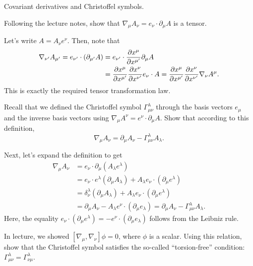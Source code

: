 \documentclass{../../templates/lkx_pset}
\begin{document}
\begin{problem}{2}
Covariant derivatives and Christoffel symbols.
\end{problem}

\begin{parts}
	\begin{part}{}
		Following the lecture notes, show that $\nabla_\mu A_\nu = e_\nu\cdot \partial_\mu A$ is a tensor.
	\end{part}

	Let's write $A = A_\nu e^\nu$. Then, note that
	\[
		\begin{aligned}
			\nabla_{\nu'} A_{\mu'} =  e_{\nu'}\cdot (\partial_{\mu'} A)
			 & = e_{\nu'}\cdot \frac{\partial x^{\mu}}{\partial x^{\mu'}}\partial_\mu A                                             \\
			 & = \frac{\partial x^\mu}{\partial x^{\mu'}}\frac{\partial x^\nu}{\partial x^{\nu'}}e_{\nu}\cdot A = \frac{\partial x^\mu}{\partial x^{\mu'}}\frac{\partial x^\nu}{\partial x^{\nu'}}\nabla_\nu A^\mu.
		\end{aligned}
	\]
	This is exactly the required tensor transformation law.

	\begin{part}{}
		Recall that we defined the Christoffel symbol $\Gamma^\lambda_{\mu\nu}$ through the basis vectors $e_\mu$ and the inverse basis vectors using $\nabla_\mu A^\nu = e^\nu \cdot \partial_\mu A$. Show that according to this definition,
		\[ \nabla_\mu A_\nu = \partial_\mu A_\nu - \Gamma^\lambda_{\mu\nu}A_\lambda.\]
	\end{part}

	Next, let's expand the definition to get
	\[
		\begin{aligned}
			\nabla_{\mu} A_{\nu}
			&= e_\nu\cdot \partial_\mu (A_\lambda e^\lambda)\\
			&= e_\nu\cdot e^\lambda(\partial_\mu A_\lambda) + A_\lambda e_\nu \cdot (\partial_\mu e^\lambda)\\
			&= \delta^\lambda_\nu (\partial_\mu A_\lambda) + A_\lambda e_\nu\cdot (\partial_\mu e^\lambda)\\
			&= \partial_\mu A_\nu - A_\lambda e^\nu\cdot (\partial_\mu e_\lambda) = \partial_\mu A_\nu - \Gamma^\lambda_{\mu\nu} A_\lambda.
		\end{aligned}
	\]
	Here, the equality $e_\nu\cdot (\partial_\mu e^\lambda) = -e^\nu\cdot (\partial_\mu e_\lambda)$ follows from the Leibniz rule.
\end{parts}

\begin{problem}{3}
In lecture, we showed $[\nabla_\mu, \nabla_\nu]\phi = 0$, where $\phi$ is a scalar. Using this relation, show that the Christoffel symbol satisfies the so-called ``torsion-free'' condition: $\Gamma^\lambda_{\mu\nu} = \Gamma^\lambda_{\nu\mu}$.
\end{problem}
\end{document}
